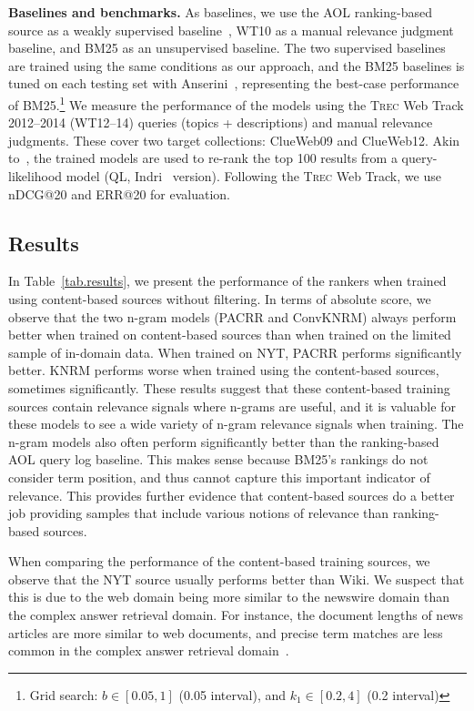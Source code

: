 \textbf{Baselines and benchmarks.}
As baselines, we use the AOL ranking-based source as a weakly supervised baseline~\cite{dehghani2017neural}, WT10 as a manual relevance judgment baseline, and BM25 as an unsupervised baseline. The two supervised baselines are trained using the same conditions as our approach, and the BM25 baselines is tuned on each testing set with Anserini~\cite{Yang2017AnseriniET}, representing the best-case performance of BM25.\footnote{Grid search: $b\in[0.05,1]$ (0.05 interval), and $k_1\in[0.2,4]$ (0.2 interval)}
We measure the performance of the models using
the \textsc{Trec} Web Track 2012--2014 (WT12--14) queries (topics + descriptions) and manual relevance judgments. These cover two target collections: ClueWeb09 and ClueWeb12.
Akin to~\cite{dehghani2017neural}, the trained models are used to
re-rank the top 100 results from a query-likelihood model (QL, Indri~\cite{strohman2005indri} version).
Following the \textsc{Trec} Web Track, we use
nDCG@20 and ERR@20 for evaluation.



\subsection{Results}\label{sec.results}
In Table~\ref{tab.results}, we present the performance of the rankers when trained using content-based sources without filtering.
In terms of absolute score, we observe that the two n-gram models (PACRR and ConvKNRM) always perform better when trained on content-based sources than when trained on the limited sample of in-domain data. When trained on NYT, PACRR performs significantly better. KNRM performs worse when trained using the content-based sources, sometimes significantly. These results suggest that these content-based training sources contain relevance signals where n-grams are useful, and it is valuable for these models to see a wide variety of n-gram relevance signals when training. The n-gram models also often perform significantly better than the ranking-based AOL query log baseline. This makes sense because BM25's rankings do not consider term position, and thus cannot capture this important indicator of relevance. This provides further evidence that content-based sources do a better job providing samples that include various notions of relevance than ranking-based sources.

When comparing the performance of the content-based training sources, we observe that the NYT source usually performs better than Wiki. We suspect that this is due to the web domain being more similar to the newswire domain than the complex answer retrieval domain. For instance, the document lengths of news articles are more similar to web documents, and precise term matches are less common in the complex answer retrieval domain~\cite{macavaney2018overcoming}.

